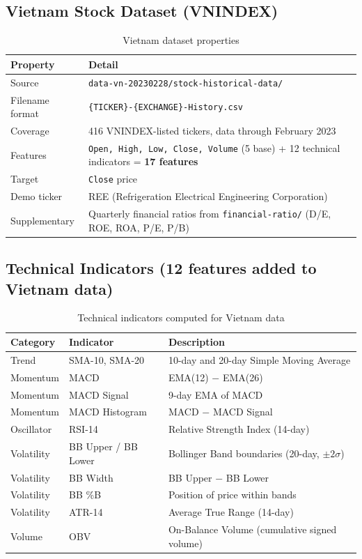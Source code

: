 \documentclass[12pt,a4paper]{article}
\begin{document}
\subsection{Vietnam Stock Dataset (VNINDEX)}

\begin{table}[H]
\centering
\caption{Vietnam dataset properties}
\begin{tabularx}{\linewidth}{lX}
\toprule
\textbf{Property} & \textbf{Detail} \\
\midrule
Source          & \texttt{data-vn-20230228/stock-historical-data/} \\
Filename format & \texttt{\{TICKER\}-\{EXCHANGE\}-History.csv} \\
Coverage        & 416 VNINDEX-listed tickers, data through February 2023 \\
Features        & \texttt{Open, High, Low, Close, Volume} (5 base) + 12 technical indicators = \textbf{17 features} \\
Target          & \texttt{Close} price \\
Demo ticker     & REE (Refrigeration Electrical Engineering Corporation) \\
Supplementary   & Quarterly financial ratios from \texttt{financial-ratio/} (D/E, ROE, ROA, P/E, P/B) \\
\bottomrule
\end{tabularx}
\end{table}

\subsection{Technical Indicators (12 features added to Vietnam data)}

\begin{table}[H]
\centering
\caption{Technical indicators computed for Vietnam data}
\begin{tabular}{llp{7cm}}
\toprule
\textbf{Category} & \textbf{Indicator} & \textbf{Description} \\
\midrule
Trend      & SMA-10, SMA-20        & 10-day and 20-day Simple Moving Average \\
Momentum   & MACD                  & EMA(12) $-$ EMA(26) \\
Momentum   & MACD Signal           & 9-day EMA of MACD \\
Momentum   & MACD Histogram        & MACD $-$ MACD Signal \\
Oscillator & RSI-14                & Relative Strength Index (14-day) \\
Volatility & BB Upper / BB Lower   & Bollinger Band boundaries (20-day, $\pm2\sigma$) \\
Volatility & BB Width              & BB Upper $-$ BB Lower \\
Volatility & BB \%B                & Position of price within bands \\
Volatility & ATR-14                & Average True Range (14-day) \\
Volume     & OBV                   & On-Balance Volume (cumulative signed volume) \\
\bottomrule
\end{tabular}
\end{table}
\end{document}

